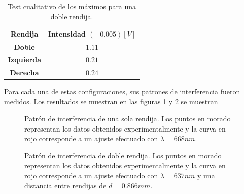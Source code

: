 \documentclass[%
 reprint,
 amsmath,amssymb,
 aps,
]{revtex4-1}
\begin{document}
{\begin{table}[h]
\begin{tabular}{c|c}
\textbf{Rendija} & \multicolumn{1}{l}{\textbf{Intensidad $(\pm 0.005)[V]$}} \\ \hline\hline
\textbf{Doble} & $1.11$ \\
\textbf{Izquierda} & $0.21$ \\
\textbf{Derecha} & $0.24$
\end{tabular}
\caption{Test cualitativo de los máximos para una doble rendija.}
\label{comparacion_tabla}
\end{table}

Para cada una de estas configuraciones, sus patrones de interferencia fueron medidos. Los resultados se muestran en las figuras \ref{patron_de_una} y \ref{patron_de_dos} se muestran 

\begin{figure}[ht]
\caption{\label{patron_de_una}Patrón de interferencia de una sola rendija. Los puntos en morado representan los datos obtenidos experimentalmente y la curva en rojo corresponde a un ajuste efectuado con $\lambda=668nm$.}
\end{figure}

\begin{figure}[h]
\caption{\label{patron_de_dos}Patrón de interferencia de doble rendija. Los puntos en morado representan los datos obtenidos experimentalmente y la curva en rojo corresponde a un ajuste efectuado con $\lambda=637nm$ y una distancia entre rendijas de $d=0.866mm$.}
\end{figure}

}
\end{document}
